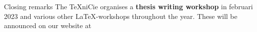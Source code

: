 \begin{frame}{Closing remarks}
The \TeX niCie organises a \textbf{thesis writing workshop} in februari 2023 and various other \LaTeX-workshops throughout the year.
These will be announced on our website at
\begin{center}
\end{center}
\end{frame}